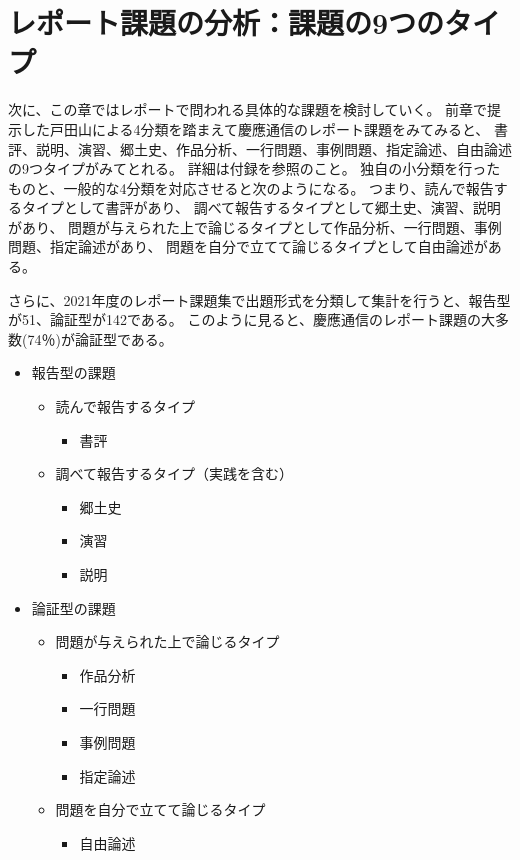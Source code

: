 \documentclass[11pt,a4paper,uplatex]{jsarticle}
\def\tightlist{}
\begin{document}
\section{レポート課題の分析：課題の9つのタイプ}

次に、この章ではレポートで問われる具体的な課題を検討していく。
前章で提示した戸田山による4分類を踏まえて慶應通信のレポート課題をみてみると、
書評、説明、演習、郷土史、作品分析、一行問題、事例問題、指定論述、自由論述の9つタイプがみてとれる。
詳細は付録を参照のこと。
独自の小分類を行ったものと、一般的な4分類を対応させると次のようになる。
つまり、読んで報告するタイプとして書評があり、
調べて報告するタイプとして郷土史、演習、説明があり、
問題が与えられた上で論じるタイプとして作品分析、一行問題、事例問題、指定論述があり、
問題を自分で立てて論じるタイプとして自由論述がある。

さらに、2021年度のレポート課題集で出題形式を分類して集計を行うと、報告型が51、論証型が142である。
このように見ると、慶應通信のレポート課題の大多数(74％)が論証型である。

\clearpage

\begin{itemize}
\tightlist
\item
  報告型の課題

  \begin{itemize}
  \tightlist
  \item
    読んで報告するタイプ

    \begin{itemize}
    \tightlist
    \item
      書評
    \end{itemize}
  \item
    調べて報告するタイプ（実践を含む）

    \begin{itemize}
    \tightlist
    \item
      郷土史
    \item
      演習
    \item
      説明
    \end{itemize}
  \end{itemize}
\item
  論証型の課題

  \begin{itemize}
  \tightlist
  \item
    問題が与えられた上で論じるタイプ

    \begin{itemize}
    \tightlist
    \item
      作品分析
    \item
      一行問題
    \item
      事例問題
    \item
      指定論述
    \end{itemize}
  \item
    問題を自分で立てて論じるタイプ

    \begin{itemize}
    \tightlist
    \item
      自由論述 \clearpage
    \end{itemize}
  \end{itemize}
\end{itemize}
\end{document}

